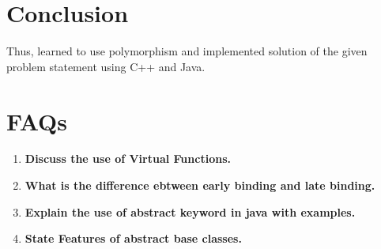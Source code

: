\documentclass[11pt]{article}
\begin{document}
\pagebreak

\section{Conclusion}
Thus, learned to use polymorphism and implemented solution of the given problem statement using C++ and Java. 

\section{FAQs}

\begin{enumerate}
	\item \textbf{Discuss the use of Virtual Functions. }\\
	\item \textbf{What is the difference ebtween early binding and late binding. }\\
	\item \textbf{Explain the use of abstract keyword in java with examples.}\\
	\item \textbf{State Features of abstract base classes.} \\
\end{enumerate}
\end{document}
